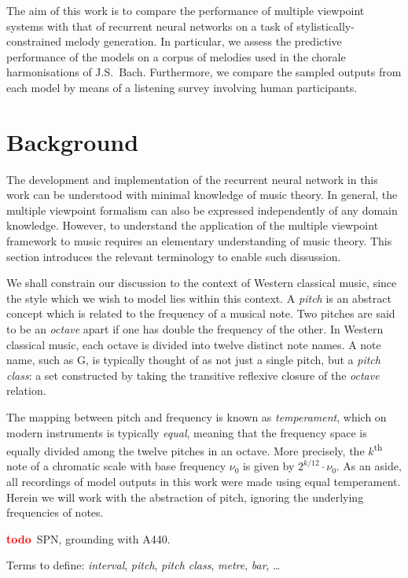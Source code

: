 \documentclass[12pt,a4paper,twoside,openright]{report}
\newcommand{\todo}{\textcolor{red}{\textbf{todo}~}}
\begin{document}
The aim of this work is to compare the performance of multiple viewpoint systems
with that of recurrent neural networks on a task of stylistically-constrained
melody generation. In particular, we assess the predictive performance of the
models on a corpus of melodies used in the chorale harmonisations of J.S.\ Bach.
Furthermore, we compare the sampled outputs from each model by means of a
listening survey involving human participants.

\section{Background}

The development and implementation of the recurrent neural network in this work
can be understood with minimal knowledge of music theory. In general, the
multiple viewpoint formalism can also be expressed independently of any domain
knowledge.  However, to understand the application of the multiple viewpoint
framework to music requires an elementary understanding of music theory.  This
section introduces the relevant terminology to enable such dissussion.

We shall constrain our discussion to the context of Western classical music,
since the style which we wish to model lies within this context. A \emph{pitch}
is an abstract concept which is related to the frequency of a musical
note. Two pitches are said to be an \emph{octave} apart if one has double the
frequency of the other. In Western classical music, each octave is divided into
twelve distinct note names. A note name, such as G, is typically thought of as
not just a single pitch, but a \emph{pitch class}: a set constructed by taking
the transitive reflexive closure of the \emph{octave} relation.

The mapping between pitch and frequency is known as \emph{temperament}, which on
modern instruments is typically \emph{equal}, meaning that the frequency space is
equally divided among the twelve pitches in an octave. More precisely, the
$k$\textsuperscript{th} note of a chromatic scale with base frequency $\nu_0$ is
given by $2^{k/12}\cdot\nu_0$. As an aside, all recordings of
model outputs in this work were made using equal temperament. Herein
we will work with the abstraction of pitch, ignoring the underlying frequencies
of notes.

\todo SPN, grounding with A440.

Terms to define: \emph{interval}, \emph{pitch}, \emph{pitch class},
\emph{metre}, \emph{bar}, \ldots
\end{document}

